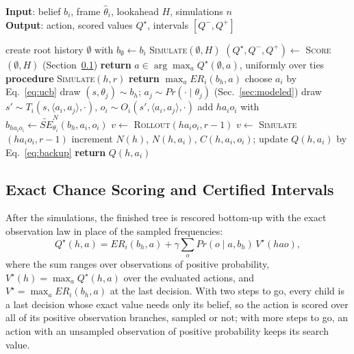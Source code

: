 \documentclass{article}
\newcommand{\SE}{\mathit{SE}}
\newcommand{\ER}{\mathit{ER}}
\newcommand{\SEN}{\widetilde{\SE}^{N}}
\newcommand{\hth}{\hat{\theta}}
\renewcommand{\Pr}{\mathit{Pr}}
\begin{document}
\begin{algorithm}[t]
\caption{I-POMCP decision of agent $i$}
\label{alg:search}
\textbf{Input}: belief $b_i$, frame $\hth_i$, lookahead $H$, simulations $n$\\
\textbf{Output}: action, scored values $Q^\star$, intervals $[Q^-, Q^+]$
\begin{algorithmic}[1]
\STATE create root history $\emptyset$ with $b_\emptyset \leftarrow b_i$
    \STATE \textsc{Simulate}$(\emptyset, H)$
\ENDFOR
\STATE $(Q^\star, Q^-, Q^+) \leftarrow$ \textsc{Score}$(\emptyset, H)$ \hfill (Section~\ref{sec:scoring})
\STATE \textbf{return} $a \in \arg\max_{a} Q^\star(\emptyset, a)$, uniformly over ties
\STATE
\STATE \textbf{procedure} \textsc{Simulate}$(h, r)$
    \STATE \textbf{return} $\max_{a} \ER_i(b_h, a)$
\ENDIF
\STATE choose $a_i$ by Eq.~\ref{eq:ucb}
\STATE draw $(s, \theta_j) \sim b_h$; $a_j \sim \Pr(\cdot \mid \theta_j)$ \hfill (Sec.~\ref{sec:modeled})
\STATE draw $s' \sim T_i(s, \langle a_i, a_j \rangle, \cdot)$, $o_i \sim O_i(s', \langle a_i, a_j \rangle, \cdot)$
    \STATE add $h a_i o_i$ with $b_{h a_i o_i} \leftarrow \SEN_{\theta_i}(b_h, a_i, o_i)$
    \STATE $v \leftarrow$ \textsc{Rollout}$(h a_i o_i, r - 1)$
\ELSE
    \STATE $v \leftarrow$ \textsc{Simulate}$(h a_i o_i, r - 1)$
\ENDIF
\STATE increment $N(h)$, $N(h, a_i)$, $C(h, a_i, o_i)$; update $Q(h, a_i)$ by Eq.~\ref{eq:backup}
\STATE \textbf{return} $Q(h, a_i)$
\end{algorithmic}
\end{algorithm}

\subsection{Exact Chance Scoring and Certified Intervals}
\label{sec:scoring}

After the simulations, the finished tree is rescored bottom-up with the exact observation law in place of the sampled frequencies:
\begin{equation}
Q^\star(h, a) = \ER_i(b_h, a) + \gamma \sum_{o} \Pr(o \mid a, b_h)\, V^\star(h a o),
\label{eq:score}
\end{equation}
where the sum ranges over observations of positive probability, $V^\star(h) = \max_a Q^\star(h, a)$ over the evaluated actions, and $V^\star = \max_a \ER_i(b_h, a)$ at the last decision. With two steps to go, every child is a last decision whose exact value needs only its belief, so the action is scored over all of its positive observation branches, sampled or not; with more steps to go, an action with an unsampled observation of positive probability keeps its search value.
\end{document}
